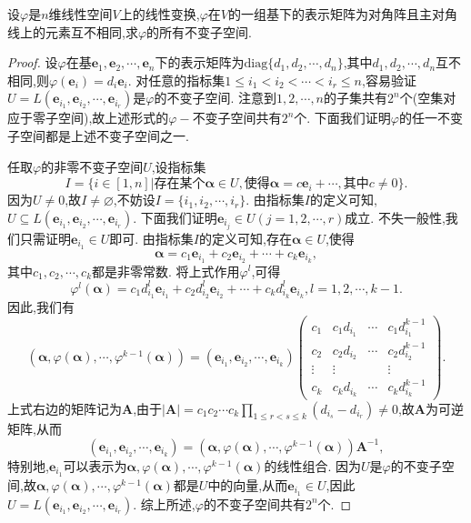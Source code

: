 \documentclass[lang=cn,newtx,10pt,scheme=chinese]{elegantbook}
\begin{document}
\begin{example}
设\(\varphi\)是\(n\)维线性空间\(V\)上的线性变换,\(\varphi\)在\(V\)的一组基下的表示矩阵为对角阵且主对角线上的元素互不相同,求\(\varphi\)的所有不变子空间.
\end{example}
\begin{proof}
    设\(\varphi\)在基\(\boldsymbol{e}_1,\boldsymbol{e}_2,\cdots,\boldsymbol{e}_n\)下的表示矩阵为\(\text{diag}\{d_1,d_2,\cdots,d_n\}\),其中\(d_1,d_2,\cdots,d_n\)互不相同,则\(\varphi(\boldsymbol{e}_i)=d_i\boldsymbol{e}_i\). 对任意的指标集\(1\leq i_1 < i_2 < \cdots < i_r\leq n\),容易验证\(U = L(\boldsymbol{e}_{i_1},\boldsymbol{e}_{i_2},\cdots,\boldsymbol{e}_{i_r})\)是\(\varphi\)的不变子空间. 注意到\(1,2,\cdots,n\)的子集共有\(2^n\)个(空集对应于零子空间),故上述形式的\(\varphi -\)不变子空间共有\(2^n\)个. 下面我们证明\(\varphi\)的任一不变子空间都是上述不变子空间之一.

任取\(\varphi\)的非零不变子空间\(U\),设指标集
\[
I = \{i\in[1,n]|\text{存在某个}\boldsymbol{\alpha}\in U,\text{使得}\boldsymbol{\alpha}=c\boldsymbol{e}_i + \cdots,\text{其中}c\neq 0\}.
\]
因为\(U\neq 0\),故\(I\neq\varnothing\),不妨设\(I = \{i_1,i_2,\cdots,i_r\}\). 由指标集\(I\)的定义可知,\(U\subseteq L(\boldsymbol{e}_{i_1},\boldsymbol{e}_{i_2},\cdots,\boldsymbol{e}_{i_r})\). 下面我们证明\(\boldsymbol{e}_{i_j}\in U(j = 1,2,\cdots,r)\)成立. 不失一般性,我们只需证明\(\boldsymbol{e}_{i_1}\in U\)即可. 由指标集\(I\)的定义可知,存在\(\boldsymbol{\alpha}\in U\),使得
\[
\boldsymbol{\alpha}=c_1\boldsymbol{e}_{i_1}+c_2\boldsymbol{e}_{i_2}+\cdots + c_k\boldsymbol{e}_{i_k},
\]
其中\(c_1,c_2,\cdots,c_k\)都是非零常数. 将上式作用\(\varphi^l\),可得
\[
\varphi^l(\boldsymbol{\alpha})=c_1d_{i_1}^l\boldsymbol{e}_{i_1}+c_2d_{i_2}^l\boldsymbol{e}_{i_2}+\cdots + c_kd_{i_k}^l\boldsymbol{e}_{i_k},l = 1,2,\cdots,k - 1.
\]
因此,我们有
\[
(\boldsymbol{\alpha},\varphi(\boldsymbol{\alpha}),\cdots,\varphi^{k - 1}(\boldsymbol{\alpha}))=(\boldsymbol{e}_{i_1},\boldsymbol{e}_{i_2},\cdots,\boldsymbol{e}_{i_k})
\begin{pmatrix}
c_1&c_1d_{i_1}&\cdots&c_1d_{i_1}^{k - 1}\\
c_2&c_2d_{i_2}&\cdots&c_2d_{i_2}^{k - 1}\\
\vdots&\vdots&&\vdots\\
c_k&c_kd_{i_k}&\cdots&c_kd_{i_k}^{k - 1}
\end{pmatrix}.
\]
上式右边的矩阵记为\(\boldsymbol{A}\),由于\(|\boldsymbol{A}| = c_1c_2\cdots c_k\prod_{1\leq r < s\leq k}(d_{i_s}-d_{i_r})\neq 0\),故\(\boldsymbol{A}\)为可逆矩阵,从而
\[
(\boldsymbol{e}_{i_1},\boldsymbol{e}_{i_2},\cdots,\boldsymbol{e}_{i_k})=(\boldsymbol{\alpha},\varphi(\boldsymbol{\alpha}),\cdots,\varphi^{k - 1}(\boldsymbol{\alpha}))\boldsymbol{A}^{-1},
\]
特别地,\(\boldsymbol{e}_{i_1}\)可以表示为\(\boldsymbol{\alpha},\varphi(\boldsymbol{\alpha}),\cdots,\varphi^{k - 1}(\boldsymbol{\alpha})\)的线性组合. 因为\(U\)是\(\varphi\)的不变子空间,故\(\boldsymbol{\alpha},\varphi(\boldsymbol{\alpha}),\cdots,\varphi^{k - 1}(\boldsymbol{\alpha})\)都是\(U\)中的向量,从而\(\boldsymbol{e}_{i_1}\in U\),因此\(U = L(\boldsymbol{e}_{i_1},\boldsymbol{e}_{i_2},\cdots,\boldsymbol{e}_{i_r})\). 综上所述,\(\varphi\)的不变子空间共有\(2^n\)个. 
\end{proof}
\end{document}

